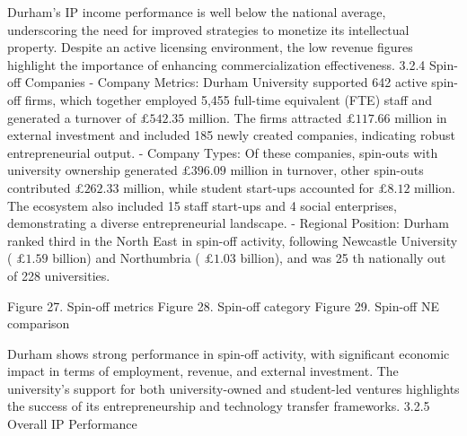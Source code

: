 Durham's IP income performance is well below the national average, underscoring the need for improved strategies to monetize its intellectual property. Despite an active licensing environment, the low revenue figures highlight the importance of enhancing commercialization effectiveness.
3.2.4 Spin-off Companies
- Company Metrics: Durham University supported 642 active spin-off firms, which together employed 5,455 full-time equivalent (FTE) staff and generated a turnover of $£ 542.35$ million. The firms attracted $£ 117.66$ million in external investment and included 185 newly created companies, indicating robust entrepreneurial output.
- Company Types: Of these companies, spin-outs with university ownership generated $£ 396.09$ million in turnover, other spin-outs contributed $£ 262.33$ million, while student start-ups accounted for $£ 8.12$ million. The ecosystem also included 15 staff start-ups and 4 social enterprises, demonstrating a diverse entrepreneurial landscape.
- Regional Position: Durham ranked third in the North East in spin-off activity, following Newcastle University ( $£ 1.59$ billion) and Northumbria ( $£ 1.03$ billion), and was 25 th nationally out of 228 universities.

Figure 27. Spin-off metrics
Figure 28. Spin-off category 
Figure 29. Spin-off NE comparison

Durham shows strong performance in spin-off activity, with significant economic impact in terms of employment, revenue, and external investment. The university's support for both university-owned and student-led ventures highlights the success of its entrepreneurship and technology transfer frameworks.
3.2.5 Overall IP Performance

